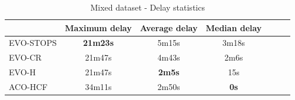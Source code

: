 \begin{table}
    \centering
    \begin{tabular}{lcccccc}
         &  Maximum delay & Average delay & Median delay \\
         \hline
         EVO-STOPS & \textbf{21m23s} & 5m15s & 3m18s \\
         EVO-CR & 21m47s & 4m43s & 2m6s \\
         EVO-H & 21m47s & \textbf{2m5s} & 15s \\
         ACO-HCF & 34m11s & 2m50s & \textbf{0s} \\
    \end{tabular}
    \caption{Mixed dataset - Delay statistics}
    \label{tab:exp_mixed_delay_stats}
\end{table}

\clearpage